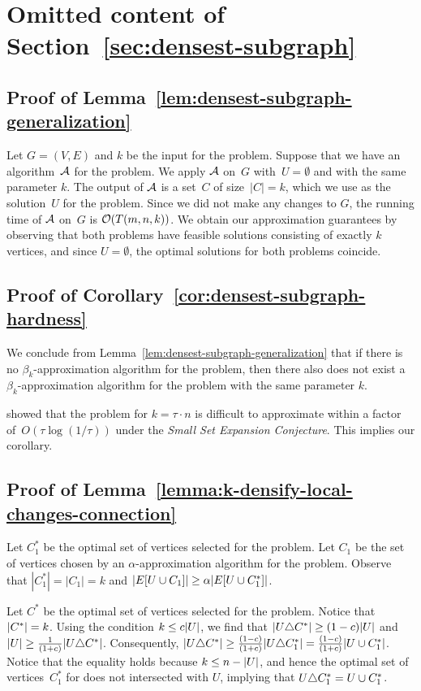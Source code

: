 \section{Omitted content of Section~\ref{sec:densest-subgraph}}
\label{appendix:ds-proofs}

\subsection{Proof of Lemma~\ref{lem:densest-subgraph-generalization}}
Let $G = (V, E)$ and $k$ be the input for the \dks problem. 
Suppose that we have an algorithm~$\mathcal{A}$ for the \dskc problem. 
We apply $\mathcal{A}$ on~$G$ with~$U = \emptyset$ and with the same parameter $k$. 
The output of $\mathcal{A}$ is a set~$C$ of size~$|C|=k$, which we use as the solution~$U$ for the \dks problem. 
Since we did not make any changes to $G$, the running time of $\mathcal{A}$ on~$G$ is $\mathcal{O}(T(m,n,k))$. 
We obtain our approximation guarantees by observing that 
both problems have feasible solutions consisting of exactly 
$k$ vertices, and since $U = \emptyset$, the optimal solutions 
for both problems coincide.

\subsection{Proof of Corollary~\ref{cor:densest-subgraph-hardness}}
We conclude from Lemma~\ref{lem:densest-subgraph-generalization} that if there is no 
$\beta_k$-approximation algorithm for the \dks problem, 
then there also does not exist a $\beta_k$-approximation algorithm 
for the \dskc problem with the same 
parameter $k$.

\citet{DBLP:conf/stoc/LeeG22} showed
that the \dks problem for $k = \tau \cdot n$ is 
difficult to approximate within a factor of~$O(\tau \log(1/\tau))$ under the \emph{Small Set Expansion Conjecture}. 
This implies our corollary.

\subsection{Proof of Lemma~\ref{lemma:k-densify-local-changes-connection}}
Let $C_1^*$ be the optimal set of vertices selected for the \kdense problem.
Let $C_1$ be the set of vertices chosen by an $\alpha$-approximation algorithm for the \kdense problem.
Observe that $|C_1^*| = |C_1| = k$ and $\lvert E[U \cup C_1]\rvert \geq \alpha \lvert E[U \cup C_1^*]\rvert$.

Let $C^*$ be the optimal set of vertices selected for the \dskc problem. Notice that $\lvert C^*\rvert = k$. 
Using the condition $k \leq c\lvert U\rvert$, we find that $|U \triangle C^*|\geq (1-c)|U|$ and $|U| \geq \frac{1}{(1 + c)} \lvert U \triangle C^*\rvert$. 
Consequently, $|U \triangle C^*| \geq \frac{(1 - c)}{(1+c)}\lvert U \triangle C_1^*\rvert = \frac{(1 - c)}{(1+c)}\lvert U \cup C_1^*\rvert$.
Notice that the equality holds because $k \leq n - \lvert U\rvert$, and hence the
optimal set of vertices~$C_1^*$ for \kdense does not intersected with $U$,
implying that $U \triangle C_1^* = U \cup C_1^*$. 

